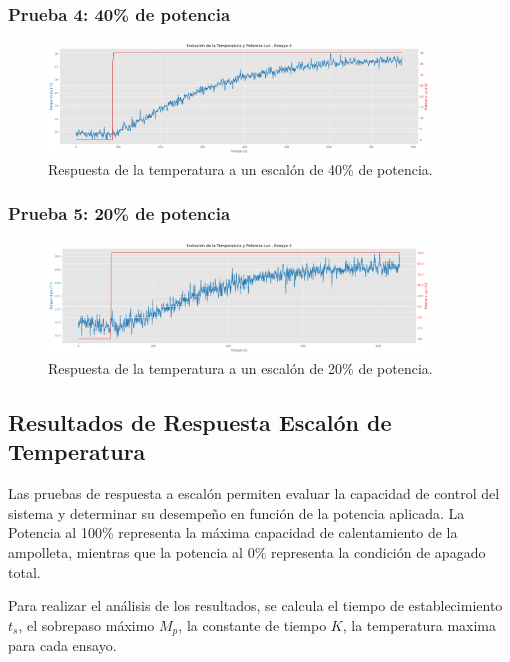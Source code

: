 \documentclass[spanish, a4paper, 11pt]{article}
\begin{document}
\newpage
\subsubsection{Prueba 4: 40\% de potencia}

\begin{figure}[ht]
    \centering
    \includegraphics[width=0.9\textwidth]{./figures/prueba4.png}
    \caption{Respuesta de la temperatura a un escalón de 40\% de potencia.}
\end{figure}
\FloatBarrier

\subsubsection{Prueba 5: 20\% de potencia}

\begin{figure}[ht]
    \centering
    \includegraphics[width=0.9\textwidth]{./figures/prueba5.png}
    \caption{Respuesta de la temperatura a un escalón de 20\% de potencia.}
\end{figure}
\FloatBarrier

\subsection{Resultados de Respuesta Escalón de Temperatura}

Las pruebas de respuesta a escalón permiten evaluar la capacidad de control del sistema y determinar su desempeño en función de la potencia aplicada. La Potencia al 100\% representa la máxima capacidad de calentamiento de la ampolleta, mientras que la potencia al 0\% representa la condición de apagado total. 

Para realizar el análisis de los resultados, se calcula el tiempo de establecimiento \( t_s \), el sobrepaso máximo \( M_p \), la constante de tiempo \( K \), la temperatura maxima para cada ensayo.
\end{document}
